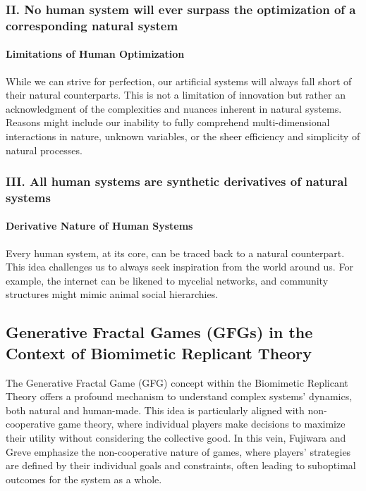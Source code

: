 \documentclass[sn-nature]{sn-jnl}%
\theoremstyle{thmstyleone}%
\theoremstyle{thmstyletwo}%
\theoremstyle{thmstylethree}%
\begin{document}
\subsubsection*{II. No human system will ever surpass the optimization of a corresponding natural
system}
\paragraph{Limitations of Human Optimization}
While we can strive for perfection, our artificial systems will always fall short of their natural counterparts. This is not a limitation of innovation but rather an acknowledgment of the complexities and nuances inherent in natural systems\cite{west_scale_2017}\cite{noble_theory_2012}.
Reasons might include our inability to fully comprehend multi-dimensional interactions in nature, unknown variables, or the sheer efficiency and simplicity of natural processes.
\subsubsection*{III. All human systems are synthetic derivatives of natural systems}
\paragraph{Derivative Nature of Human Systems}
Every human system, at its core, can be traced back to a natural counterpart. This idea challenges us to always seek inspiration from the world around us\cite{odum_ecological_1994}.
For example, the internet can be likened to mycelial networks, and community structures might mimic animal social hierarchies.


\subsection{Generative Fractal Games (GFGs) in the Context of Biomimetic Replicant Theory}
The Generative Fractal Game (GFG) concept within the Biomimetic Replicant Theory offers a profound mechanism to understand complex systems' dynamics, both natural and human-made. This idea is particularly aligned with non-cooperative game theory, where individual players make decisions to maximize their utility without considering the collective good. In this vein, Fujiwara and Greve\cite{fujiwara-greve_non-cooperative_2015} emphasize the non-cooperative nature of games, where players' strategies are defined by their individual goals and constraints, often leading to suboptimal outcomes for the system as a whole.
\end{document}
